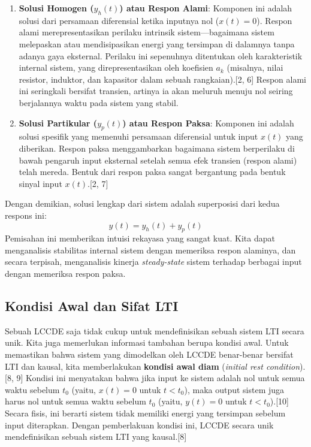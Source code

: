 \documentclass[12pt, a4paper]{article}
\begin{document}
\begin{enumerate}
    \item \textbf{Solusi Homogen ($y_h(t)$) atau Respon Alami}: Komponen ini adalah solusi dari persamaan diferensial ketika inputnya nol ($x(t) = 0$). Respon alami merepresentasikan perilaku intrinsik sistem—bagaimana sistem melepaskan atau mendisipasikan energi yang tersimpan di dalamnya tanpa adanya gaya eksternal. Perilaku ini sepenuhnya ditentukan oleh karakteristik internal sistem, yang direpresentasikan oleh koefisien $a_k$ (misalnya, nilai resistor, induktor, dan kapasitor dalam sebuah rangkaian).[2, 6] Respon alami ini seringkali bersifat transien, artinya ia akan meluruh menuju nol seiring berjalannya waktu pada sistem yang stabil.

    \item \textbf{Solusi Partikular ($y_p(t)$) atau Respon Paksa}: Komponen ini adalah solusi spesifik yang memenuhi persamaan diferensial untuk input $x(t)$ yang diberikan. Respon paksa menggambarkan bagaimana sistem berperilaku di bawah pengaruh input eksternal setelah semua efek transien (respon alami) telah mereda. Bentuk dari respon paksa sangat bergantung pada bentuk sinyal input $x(t)$.[2, 7]
\end{enumerate}

Dengan demikian, solusi lengkap dari sistem adalah superposisi dari kedua respons ini:
\[
y(t) = y_h(t) + y_p(t)
\]
Pemisahan ini memberikan intuisi rekayasa yang sangat kuat. Kita dapat menganalisis stabilitas internal sistem dengan memeriksa respon alaminya, dan secara terpisah, menganalisis kinerja \textit{steady-state} sistem terhadap berbagai input dengan memeriksa respon paksa.

\subsection{Kondisi Awal dan Sifat LTI}
Sebuah LCCDE saja tidak cukup untuk mendefinisikan sebuah sistem LTI secara unik. Kita juga memerlukan informasi tambahan berupa kondisi awal. Untuk memastikan bahwa sistem yang dimodelkan oleh LCCDE benar-benar bersifat LTI dan kausal, kita memberlakukan \textbf{kondisi awal diam} (\textit{initial rest condition}).[8, 9] Kondisi ini menyatakan bahwa jika input ke sistem adalah nol untuk semua waktu sebelum $t_0$ (yaitu, $x(t) = 0$ untuk $t < t_0$), maka output sistem juga harus nol untuk semua waktu sebelum $t_0$ (yaitu, $y(t) = 0$ untuk $t < t_0$).[10] Secara fisis, ini berarti sistem tidak memiliki energi yang tersimpan sebelum input diterapkan. Dengan pemberlakuan kondisi ini, LCCDE secara unik mendefinisikan sebuah sistem LTI yang kausal.[8]
\end{document}
